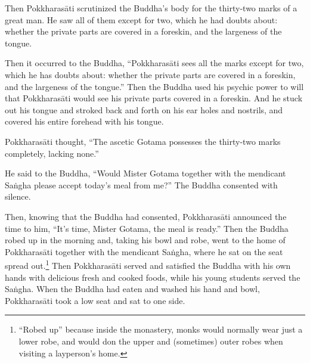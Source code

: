 \documentclass[12pt,openany]{book}%
\begin{document}
Then \textsanskrit{Pokkharasāti} scrutinized the Buddha’s body for the thirty-two marks of a great man. He saw all of them except for two, which he had doubts about: whether the private parts are covered in a foreskin, and the largeness of the tongue. 

Then it occurred to the Buddha, “\textsanskrit{Pokkharasāti} sees all the marks except for two, which he has doubts about: whether the private parts are covered in a foreskin, and the largeness of the tongue.” Then the Buddha used his psychic power to will that \textsanskrit{Pokkharasāti} would see his private parts covered in a foreskin. And he stuck out his tongue and stroked back and forth on his ear holes and nostrils, and covered his entire forehead with his tongue. 

\textsanskrit{Pokkharasāti} thought, “The ascetic Gotama possesses the thirty-two marks completely, lacking none.” 

He said to the Buddha, “Would Mister Gotama together with the mendicant \textsanskrit{Saṅgha} please accept today’s meal from me?” The Buddha consented with silence. 

Then, knowing that the Buddha had consented, \textsanskrit{Pokkharasāti} announced the time to him, “It’s time, Mister Gotama, the meal is ready.” Then the Buddha robed up in the morning and, taking his bowl and robe, went to the home of \textsanskrit{Pokkharasāti} together with the mendicant \textsanskrit{Saṅgha}, where he sat on the seat spread out.\footnote{“Robed up” because inside the monastery, monks would normally wear just a lower robe, and would don the upper and (sometimes) outer robes when visiting a layperson’s home. } Then \textsanskrit{Pokkharasāti} served and satisfied the Buddha with his own hands with delicious fresh and cooked foods, while his young students served the \textsanskrit{Saṅgha}. When the Buddha had eaten and washed his hand and bowl, \textsanskrit{Pokkharasāti} took a low seat and sat to one side. 
\end{document}

